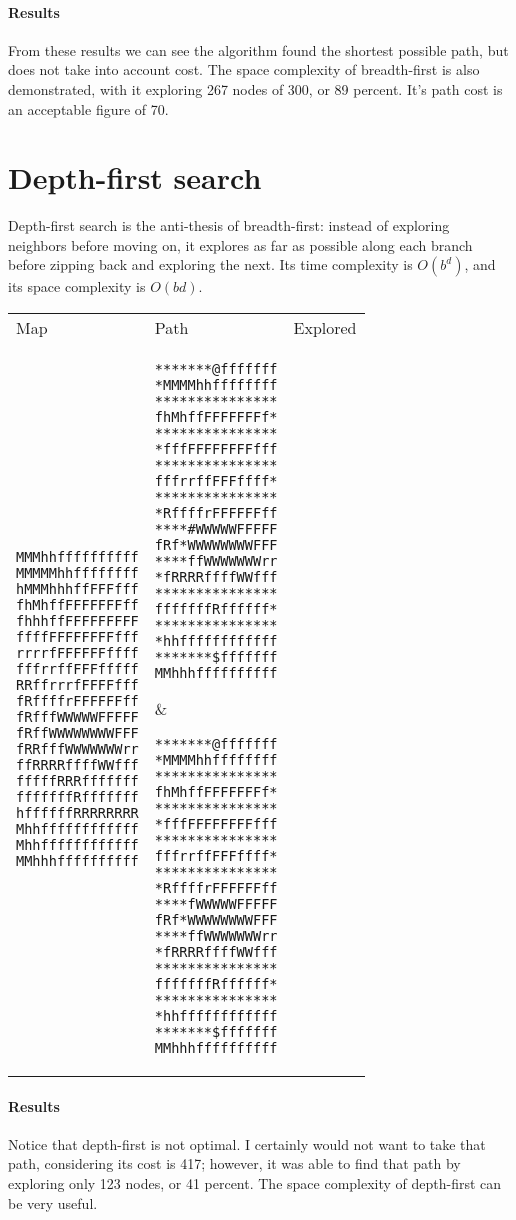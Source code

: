 \documentclass[12pt, article]{scrartcl}
\begin{document}
\paragraph{Results}
From these results we can see the algorithm found the shortest possible path, but does not take into account cost. The space complexity of breadth-first is also demonstrated, with it exploring 267 nodes of 300, or 89 percent. It's path cost is an acceptable figure of 70. \\

\section{Depth-first search}
Depth-first search is the anti-thesis of breadth-first: instead of exploring neighbors before moving on, it explores as far as possible along each branch before zipping back and exploring the next. Its time complexity is $O(b^d)$, and its space complexity is $O(bd)$.
\begin{tabular}{p{2in} p{2in} p{2in}}
Map & Path & Explored \\

\begin{verbatim}
MMMhhffffffffff
MMMMMhhffffffff
hMMMhhhffFFFfff
fhMhffFFFFFFFff
fhhhffFFFFFFFFF
ffffFFFFFFFFfff
rrrrfFFFFFFffff
fffrrffFFFfffff
RRffrrrfFFFFfff
fRffffrFFFFFFff
fRfffWWWWWFFFFF
fRffWWWWWWWWFFF
fRRfffWWWWWWWrr
ffRRRRffffWWfff
fffffRRRfffffff
fffffffRfffffff
hffffffRRRRRRRR
Mhhffffffffffff
Mhhffffffffffff
MMhhhffffffffff
\end{verbatim}
&
\begin{verbatim}
*******@fffffff
*MMMMhhffffffff
***************
fhMhffFFFFFFFf*
***************
*fffFFFFFFFFfff
***************
fffrrffFFFffff*
***************
*RffffrFFFFFFff
****#WWWWWFFFFF
fRf*WWWWWWWWFFF
****ffWWWWWWWrr
*fRRRRffffWWfff
***************
fffffffRffffff*
***************
*hhffffffffffff
*******$fffffff
MMhhhffffffffff
\end{verbatim}
&
\begin{verbatim}
*******@fffffff
*MMMMhhffffffff
***************
fhMhffFFFFFFFf*
***************
*fffFFFFFFFFfff
***************
fffrrffFFFffff*
***************
*RffffrFFFFFFff
****fWWWWWFFFFF
fRf*WWWWWWWWFFF
****ffWWWWWWWrr
*fRRRRffffWWfff
***************
fffffffRffffff*
***************
*hhffffffffffff
*******$fffffff
MMhhhffffffffff
\end{verbatim}
\end{tabular}
\paragraph{Results}
Notice that depth-first is not optimal. I certainly would not want to take that path, considering its cost is 417; however, it was able to find that path by exploring only 123 nodes, or 41 percent. The space complexity of depth-first can be very useful. \\
\end{document}
